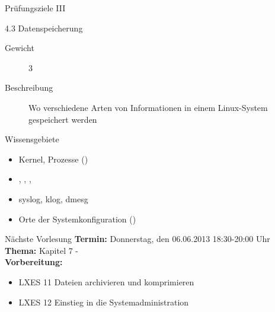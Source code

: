 \documentclass[aspectratio=43]{beamer}
\begin{document}
\begin{frame}{Prüfungsziele III}
  \begin{alertblock}{4.3 Datenspeicherung}
    \begin{description}
      \item[Gewicht]  3
      \item[Beschreibung] Wo verschiedene Arten von Informationen in einem Linux-System gespeichert werden
    \end{description}
       Wissensgebiete\\ 
        \begin{itemize}
          \item Kernel, Prozesse ()
          \item {}, , , 
          \item  syslog, klog, dmesg
          \item Orte der Systemkonfiguration ()
        \end{itemize}
  \end{alertblock}
\end{frame}
\begin{frame}[plain]
  \begin{alertblock}{Nächste Vorlesung}
    \textbf{Termin:} Donnerstag, den 06.06.2013 18:30-20:00 Uhr\\
    \textbf{Thema:} Kapitel 7 - \\
    \textbf{Vorbereitung:} 
    \begin{itemize}
      \item LXES 11 Dateien archivieren und komprimieren
      \item LXES 12 Einstieg in die Systemadministration
    \end{itemize}
  \end{alertblock}
\end{frame}


\materialframe
\end{document}
